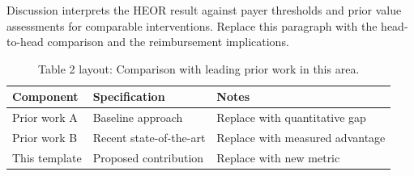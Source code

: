 
Discussion interprets the HEOR result against payer thresholds and prior value assessments for comparable interventions. Replace this paragraph with the head-to-head comparison and the reimbursement implications.

\begin{table}[H]
\caption{Table 2 layout: Comparison with leading prior work in this area.}
\label{tab:discussion_compare}
\centering
\begin{tabular}{>{\raggedright\arraybackslash}p{3.4cm} >{\raggedright\arraybackslash}p{4.6cm} >{\raggedright\arraybackslash}p{5.4cm}}
\toprule
\textbf{Component} & \textbf{Specification} & \textbf{Notes} \\
\midrule
  Prior work A & Baseline approach & Replace with quantitative gap \\
  Prior work B & Recent state-of-the-art & Replace with measured advantage \\
  This template & Proposed contribution & Replace with new metric \\
\bottomrule
\end{tabular}
\end{table}
